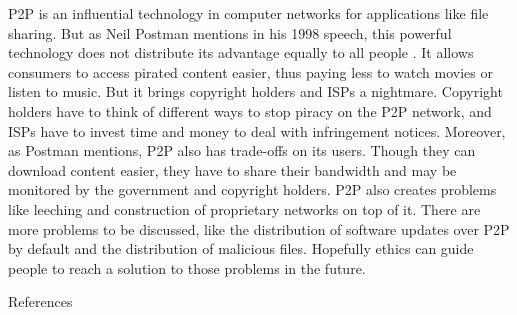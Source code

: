 \documentclass[12pt]{article}
\begin{document}
P2P is an influential technology in computer networks for applications like file sharing. But as Neil Postman mentions in his 1998 speech, this powerful technology does not distribute its advantage equally to all people \cite{59_postman1998five}. It allows consumers to access pirated content easier, thus paying less to watch movies or listen to music. But it brings copyright holders and ISPs a nightmare. Copyright holders have to think of different ways to stop piracy on the P2P network, and ISPs have to invest time and money to deal with infringement notices. Moreover, as Postman mentions, P2P also has trade-offs on its users. Though they can download content easier, they have to share their bandwidth and may be monitored by the government and copyright holders. 
P2P also creates problems like leeching and construction of proprietary networks on top of it. There are more problems to be discussed, like the distribution of software updates over P2P by default and the distribution of malicious files. Hopefully ethics can guide people to reach a solution to those problems in the future.

\newpage
\centerline{References}
\printbibliography[heading=none]
\end{document}
